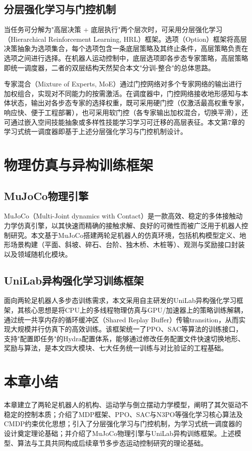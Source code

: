\subsection{分层强化学习与门控机制}

当任务可分解为"高层决策 + 底层执行"两个层次时，可采用分层强化学习（Hierarchical Reinforcement Learning, HRL）框架。选项（Option）框架\cite{sutton1999}将高层决策抽象为选项集合，每个选项包含一条底层策略及其终止条件，高层策略负责在选项之间进行选择。在机器人运动控制中，底层选项即各步态专家策略，高层策略即统一调度器，二者的双层结构天然契合本文"分训-整合"的总体思路。

专家混合（Mixture of Experts, MoE）\cite{jacobs1991,shazeer2017}通过门控网络对多个专家网络的输出进行加权组合，实现对不同能力的按需激活。在调度器中，门控网络接收地形感知与本体状态，输出对各步态专家的选择权重，既可采用硬门控（仅激活最高权重专家，响应快、便于工程部署），也可采用软门控（各专家输出加权混合，切换平滑），还可通过嵌入空间技能抽象\cite{hausman2018}或多样性技能学习\cite{eysenbach2019}学习可迁移的高层表征。本文第7章的学习式统一调度器即基于上述分层强化学习与门控机制设计。

\section{物理仿真与异构训练框架}

\subsection{MuJoCo物理引擎}

MuJoCo（Multi-Joint dynamics with Contact）是一款高效、稳定的多体接触动力学仿真引擎\cite{todorov2012}，以其快速而精确的接触求解、良好的可微性而被广泛用于机器人控制研究。本文基于MuJoCo搭建两轮足机器人的仿真环境，包括机构模型定义、地形场景构建（平面、斜坡、碎石、台阶、独木桥、木桩等）、观测与奖励接口封装以及领域随机化模块。

\subsection{UniLab异构强化学习训练框架}

面向两轮足机器人多步态训练需求，本文采用自主研发的UniLab异构强化学习框架，其核心思想是将CPU上的多线程物理仿真与GPU/加速器上的策略训练解耦，通过统一共享内存的循环缓冲区（Shared Replay Buffer）传输transition，从而实现大规模并行仿真下的高效训练。该框架统一了PPO、SAC等算法的训练接口，支持"配置即任务"的Hydra配置体系，能够通过修改任务配置文件快速切换地形、奖励与算法，是本文四大模块、七大任务统一训练与对比验证的工程基础。

\section{本章小结}

本章建立了两轮足机器人的机构、运动学与倒立摆动力学模型，阐明了其欠驱动不稳定的控制本质；介绍了MDP框架、PPO、SAC与N3PO等强化学习核心算法及CMDP约束优化思想；引入了分层强化学习与门控机制，为学习式统一调度器的设计奠定理论基础；并介绍了MuJoCo物理引擎与UniLab异构训练框架。上述模型、算法与工具共同构成后续章节多步态运动控制研究的理论基础。
